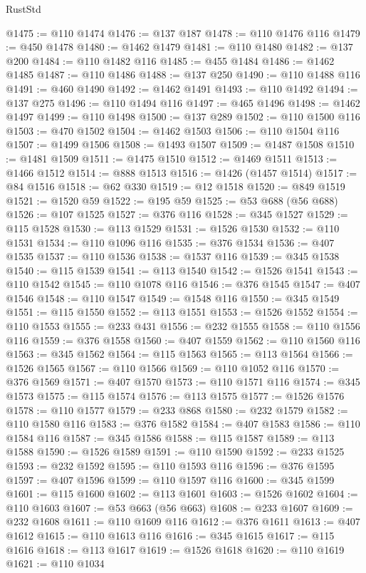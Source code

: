 \begin{lexlean}{RustStd}
\begin{coremodule}
{\begin{coremodule}
{{{{{{{{{{{{{{{{{{{{{{{{{{{{{{{{{{{{{{{{{{{{{{{@1475 := @110 @1474
@1476 := @137 @187
@1478 := @110 @1476 @116
@1479 := @450 @1478
@1480 := @1462 @1479
@1481 := @110 @1480
@1482 := @137 @200
@1484 := @110 @1482 @116
@1485 := @455 @1484
@1486 := @1462 @1485
@1487 := @110 @1486
@1488 := @137 @250
@1490 := @110 @1488 @116
@1491 := @460 @1490
@1492 := @1462 @1491
@1493 := @110 @1492
@1494 := @137 @275
@1496 := @110 @1494 @116
@1497 := @465 @1496
@1498 := @1462 @1497
@1499 := @110 @1498
@1500 := @137 @289
@1502 := @110 @1500 @116
@1503 := @470 @1502
@1504 := @1462 @1503
@1506 := @110 @1504 @116
@1507 := @1499 @1506
@1508 := @1493 @1507
@1509 := @1487 @1508
@1510 := @1481 @1509
@1511 := @1475 @1510
@1512 := @1469 @1511
@1513 := @1466 @1512
@1514 := @888 @1513
@1516 := @1426 (@1457 @1514)
@1517 := @84 @1516
@1518 := @62 @330
@1519 := @12 @1518
@1520 := @849 @1519
@1521 := @1520 @59
@1522 := @195 @59
@1525 := @53 @688 (@56 @688)
@1526 := @107 @1525
@1527 := @376 @116
@1528 := @345 @1527
@1529 := @115 @1528
@1530 := @113 @1529
@1531 := @1526 @1530
@1532 := @110 @1531
@1534 := @110 @1096 @116
@1535 := @376 @1534
@1536 := @407 @1535
@1537 := @110 @1536
@1538 := @1537 @116
@1539 := @345 @1538
@1540 := @115 @1539
@1541 := @113 @1540
@1542 := @1526 @1541
@1543 := @110 @1542
@1545 := @110 @1078 @116
@1546 := @376 @1545
@1547 := @407 @1546
@1548 := @110 @1547
@1549 := @1548 @116
@1550 := @345 @1549
@1551 := @115 @1550
@1552 := @113 @1551
@1553 := @1526 @1552
@1554 := @110 @1553
@1555 := @233 @431
@1556 := @232 @1555
@1558 := @110 @1556 @116
@1559 := @376 @1558
@1560 := @407 @1559
@1562 := @110 @1560 @116
@1563 := @345 @1562
@1564 := @115 @1563
@1565 := @113 @1564
@1566 := @1526 @1565
@1567 := @110 @1566
@1569 := @110 @1052 @116
@1570 := @376 @1569
@1571 := @407 @1570
@1573 := @110 @1571 @116
@1574 := @345 @1573
@1575 := @115 @1574
@1576 := @113 @1575
@1577 := @1526 @1576
@1578 := @110 @1577
@1579 := @233 @868
@1580 := @232 @1579
@1582 := @110 @1580 @116
@1583 := @376 @1582
@1584 := @407 @1583
@1586 := @110 @1584 @116
@1587 := @345 @1586
@1588 := @115 @1587
@1589 := @113 @1588
@1590 := @1526 @1589
@1591 := @110 @1590
@1592 := @233 @1525
@1593 := @232 @1592
@1595 := @110 @1593 @116
@1596 := @376 @1595
@1597 := @407 @1596
@1599 := @110 @1597 @116
@1600 := @345 @1599
@1601 := @115 @1600
@1602 := @113 @1601
@1603 := @1526 @1602
@1604 := @110 @1603
@1607 := @53 @663 (@56 @663)
@1608 := @233 @1607
@1609 := @232 @1608
@1611 := @110 @1609 @116
@1612 := @376 @1611
@1613 := @407 @1612
@1615 := @110 @1613 @116
@1616 := @345 @1615
@1617 := @115 @1616
@1618 := @113 @1617
@1619 := @1526 @1618
@1620 := @110 @1619
@1621 := @110 @1034
}}}}}}}}}}}}}}}}}}}}}}}}}}}}}}}}}}}}}}}}}}}}}}}
\end{coremodule}}
\end{coremodule}
\end{lexlean}
